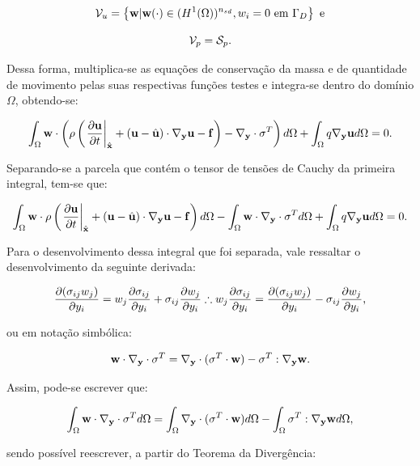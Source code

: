 \documentclass[_ArquivoPrincipal.tex]{subfiles}
\begin{document}
\begin{equation}
    \mathcal{V}_u=\left\{\mathbf{w}|\mathbf{w}(\cdot)\in(H^1(\Omega))^{n_{sd}},w_i=0\text{ em }\Gamma_D\right\}\text{ e}
\end{equation}

\begin{equation}
    \mathcal{V}_p=\mathcal{S}_p\text{.}
\end{equation}

Dessa forma, multiplica-se as equações de conservação da massa e de quantidade de movimento pelas suas respectivas funções testes e integra-se dentro do domínio $\Omega$, obtendo-se:

\begin{equation}
    \int_\Omega{\mathbf{w}\cdot\left(\rho\left(\left.\frac{\partial{\mathbf{u}}}{\partial{t}}\right|_{\hat{\mathbf{x}}}+(\mathbf{u}-\hat{\mathbf{u}})\cdot\mathbf{\nabla_y}\mathbf{u}-\mathbf{f}\right)-\mathbf{\nabla_y}\cdot\mathbf{\sigma}^T\right)d\Omega}+\int_\Omega{q\mathbf{\nabla_y}\mathbf{u}d\Omega}=0\text{.}
\end{equation}

Separando-se a parcela que contém o tensor de tensões de Cauchy da primeira integral, tem-se que:

\begin{equation}
    \int_\Omega{\mathbf{w}\cdot\rho\left(\left.\frac{\partial{\mathbf{u}}}{\partial{t}}\right|_{\hat{\mathbf{x}}}+(\mathbf{u}-\hat{\mathbf{u}})\cdot\mathbf{\nabla_y}\mathbf{u}-\mathbf{f}\right)d\Omega}-\int_\Omega{\mathbf{w}\cdot\mathbf{\nabla_y}\cdot\mathbf{\sigma}^Td\Omega}+\int_\Omega{q\mathbf{\nabla_y}\mathbf{u}d\Omega}=0\text{.}
    \label{eq:WeakForm1}
\end{equation}

Para o desenvolvimento dessa integral que foi separada, vale ressaltar o desenvolvimento da seguinte derivada:

\[
\frac{\partial{(\sigma_{ij}w_j)}}{\partial{y_i}}=w_j\frac{\partial{\sigma_{ij}}}{\partial{y_i}}+\sigma_{ij}\frac{\partial{w_j}}{\partial{y_i}}\therefore w_j\frac{\partial{\sigma_{ij}}}{\partial{y_i}}=\frac{\partial{(\sigma_{ij}w_j)}}{\partial{y_i}}-\sigma_{ij}\frac{\partial{w_j}}{\partial{y_i}}\text{,}
\]

\noindent ou em notação simbólica:

\begin{equation}
    \mathbf{w}\cdot\mathbf{\nabla_y}\cdot\mathbf{\sigma}^T=\mathbf{\nabla_y}\cdot(\mathbf{\sigma}^T\cdot\mathbf{w})-\mathbf{\sigma}^T:\mathbf{\nabla_y}\mathbf{w}\text{.}
\end{equation}

Assim, pode-se escrever que:

\begin{equation}
     \int_\Omega{\mathbf{w}\cdot\mathbf{\nabla_y}\cdot\mathbf{\sigma}^Td\Omega}=
     \int_\Omega{\mathbf{\nabla_y}\cdot(\mathbf{\sigma}^T\cdot\mathbf{w})d\Omega}-\int_\Omega{\mathbf{\sigma}^T:\mathbf{\nabla_y}\mathbf{w}d\Omega}\text{,}
\end{equation}

\noindent sendo possível reescrever, a partir do Teorema da Divergência:
\end{document}
